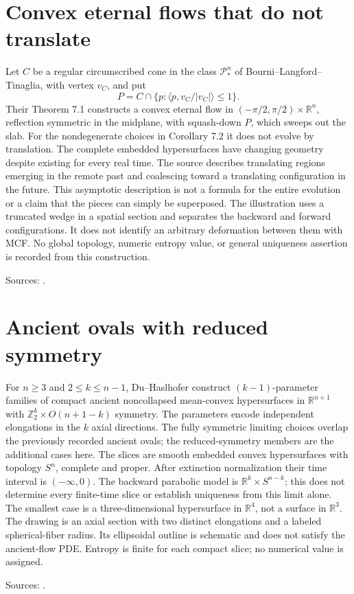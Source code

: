 \chapter{Convex eternal flows that do not translate}\label{sec:catalogue-convex-eternal-nontranslators}
\begin{example}\label{ex:catalogue-convex-eternal-nontranslators}
Let $C$ be a regular circumscribed cone in the class $\mathcal P_*^n$ of Bourni--Langford--Tinaglia, with vertex $v_C$, and put
\[
 P=C\cap\{p:\langle p,v_C/|v_C|\rangle\le1\}.
\]
Their Theorem 7.1 constructs a convex eternal flow in $(-\pi/2,\pi/2)\times\mathbb R^n$, reflection symmetric in the midplane, with squash-down $P$, which sweeps out the slab. For the nondegenerate choices in Corollary 7.2 it does not evolve by translation. The complete embedded hypersurfaces have changing geometry despite existing for every real time.
The source describes translating regions emerging in the remote past and coalescing toward a translating configuration in the future. This asymptotic description is not a formula for the entire evolution or a claim that the pieces can simply be superposed. The illustration uses a truncated wedge in a spatial section and separates the backward and forward configurations. It does not identify an arbitrary deformation between them with MCF. No global topology, numeric entropy value, or general uniqueness assertion is recorded from this construction.
\par Sources: \cite{CatBourniLangfordTinaglia2022}.
\end{example}

\chapter{Ancient ovals with reduced symmetry}\label{sec:catalogue-reduced-symmetry-ancient-ovals}
\begin{example}\label{ex:catalogue-reduced-symmetry-ancient-ovals}
For $n\ge3$ and $2\le k\le n-1$, Du--Haslhofer construct $(k-1)$-parameter families of compact ancient noncollapsed mean-convex hypersurfaces in $\mathbb R^{n+1}$ with $\mathbb Z_2^k\times O(n+1-k)$ symmetry. The parameters encode independent elongations in the $k$ axial directions. The fully symmetric limiting choices overlap the previously recorded ancient ovals; the reduced-symmetry members are the additional cases here.
The slices are smooth embedded convex hypersurfaces with topology $S^n$, complete and proper. After extinction normalization their time interval is $(-\infty,0)$. The backward parabolic model is $\mathbb R^k\times S^{n-k}$; this does not determine every finite-time slice or establish uniqueness from this limit alone. The smallest case is a three-dimensional hypersurface in $\mathbb R^4$, not a surface in $\mathbb R^3$. The drawing is an axial section with two distinct elongations and a labeled spherical-fiber radius. Its ellipsoidal outline is schematic and does not satisfy the ancient-flow PDE. Entropy is finite for each compact slice; no numerical value is assigned.
\par Sources: \cite{CatDuHaslhofer2021}.
\end{example}

